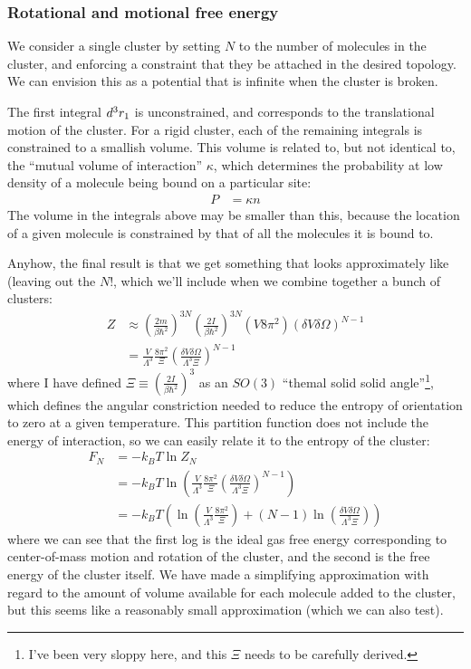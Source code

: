 \documentclass[letterpaper,twocolumn,amsmath,amssymb,pre]{revtex4-1}
\begin{document}
\subsubsection{Rotational and motional free energy}

We consider a single cluster by setting $N$ to the number of molecules
in the cluster, and enforcing a constraint that they be attached in
the desired topology.  We can envision this as a potential that is
infinite when the cluster is broken.

The first integral $d^3r_1$ is unconstrained, and corresponds to the
translational motion of the cluster.  For a rigid cluster, each of the
remaining integrals is constrained to a smallish volume.  This volume
is related to, but not identical to, the ``mutual volume of
interaction'' $\kappa$, which determines the probability at low
density of a molecule being bound on a particular site:
\begin{align}
  P &= \kappa n
\end{align}
The volume in the integrals above may be smaller than this, because
the location of a given molecule is constrained by that of all the
molecules it is bound to.

Anyhow, the final result is that we get something that looks
approximately like (leaving out the $N!$, which we'll include when we
combine together a bunch of clusters:
\begin{align}
  Z &\approx
  \left(\frac{2m}{\beta\hbar^2}\right)^{3N}
  \left(\frac{2I}{\beta\hbar^2}\right)^{3N}
  (V 8\pi^2) (\delta V \delta \Omega)^{N-1}
  \\
  &= \frac{V}{\Lambda^3}\frac{8\pi^2}{\Xi}
  \left(\frac{\delta V \delta \Omega}{\Lambda^3\Xi}\right)^{N-1}
\end{align}
where I have defined $\Xi \equiv
\left(\frac{2I}{\beta\hbar^2}\right)^3$ as an $SO(3)$ ``themal solid
solid angle''\footnote{I've been very sloppy here, and this $\Xi$
  needs to be carefully derived.}, which defines the angular
constriction needed to reduce the entropy of orientation to zero at a
given temperature.  This partition function does not include the
energy of interaction, so we can easily relate it to the entropy of
the cluster:
\begin{align}
  F_N &= -k_BT \ln Z_N \\
  &= -k_BT \ln\left(
     \frac{V}{\Lambda^3}\frac{8\pi^2}{\Xi}
     \left(\frac{\delta V \delta \Omega}{\Lambda^3\Xi}\right)^{N-1}
  \right)
  \\
  &= -k_BT \left(
    \ln\left(
     \frac{V}{\Lambda^3}\frac{8\pi^2}{\Xi}
    \right)
    +
    (N-1)
    \ln\left(
     \frac{\delta V \delta \Omega}{\Lambda^3\Xi}
    \right)
  \right)
\end{align}
where we can see that the first log is the ideal gas free energy
corresponding to center-of-mass motion and rotation of the cluster,
and the second is the free energy of the cluster itself.  We have made
a simplifying approximation with regard to the amount of volume
available for each molecule added to the cluster, but this seems like
a reasonably small approximation (which we can also test).
\end{document}
